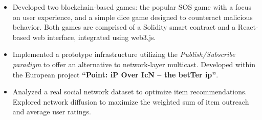 \documentclass[10pt,a4paper,ragged2e,withhyper]{altacv}
\begin{document}
\begin{paracol}{2}
            \begin{itemize}
                \item[] Developed two blockchain-based games: the popular SOS game with a focus on user experience, and a simple dice game designed to counteract malicious behavior. Both games are comprised of a Solidity smart contract and a React-based web interface, integrated using web3.js.
            \end{itemize}
            \divider

            \begin{itemize}
                \item[] Implemented a prototype infrastructure utilizing the \emph{Publish/Subscribe paradigm} to offer an alternative to network-layer multicast. Developed within the European project \textbf{``Point: iP Over IcN – the betTer ip''}.
            \end{itemize}
            \divider

            \begin{itemize}
                \item[] Analyzed a real social network dataset to optimize item recommendations. Explored network diffusion to maximize the weighted sum of item outreach and average user ratings.
            \end{itemize}
    \end{paracol}
\end{document}
